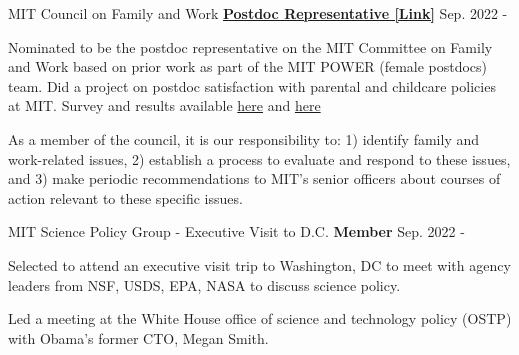 

\begin{cventries}

  \cventry 
    {MIT} %
    {Council on Family and Work}
    {\href{https://drive.google.com/file/d/1KEYOxyQlJCVVjhXWzmFyOpVgB2zHHPXx/view?usp=sharing}{\textbf{Postdoc Representative [Link]}}}
    {Sep. 2022 -} %
    {
      \begin{cvitems} %
        \item {Nominated to be the postdoc representative on the MIT Committee on Family and Work based on prior work as part of the MIT POWER (female postdocs) team. Did a project on postdoc satisfaction with parental and childcare policies at MIT. Survey and results available {\href{https://drive.google.com/file/d/1fMhWOel-4FEX4SDK02NLmEE5upsajKBK/view?usp=sharing}{here}} and \href{https://docs.google.com/presentation/d/1VMELasSNFhN1QjrGt7P7uAFt0IQIIH-c8I0jKGWZdzI/edit?usp=sharing}{here}}
        \item {As a member of the council, it is our responsibility to: 1) identify family and work-related issues, 2) establish a process to evaluate and respond to these issues, and 3) make periodic recommendations to MIT's senior officers about courses of action relevant to these specific issues.}
      \end{cvitems}
    }

  \cventry 
    {MIT} %
    {Science Policy Group - Executive Visit to D.C.}
    {\textbf{Member}} %
    {Sep. 2022 -} %
    {
      \begin{cvitems} %
        \item {Selected to attend an executive visit trip to Washington, DC to meet with agency leaders from NSF, USDS, EPA, NASA to discuss science policy.}
        \item {Led a meeting at the White House office of science and technology policy (OSTP) with Obama's former CTO, Megan Smith.}
      \end{cvitems}
    }


\end{cventries}
